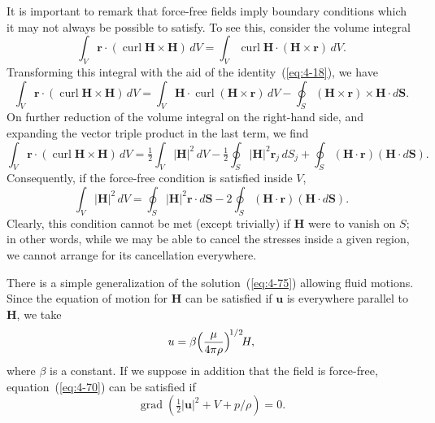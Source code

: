 It is important to remark that force-free fields imply boundary conditions which it may not always be possible to satisfy. To see this, consider the volume integral
\begin{equation}
\label{eq:4-76}
\int_V \mathbf{r}\cdot(\operatorname{curl}\mathbf{H}\times\mathbf{H})\,dV = \int_V \operatorname{curl}\mathbf{H}\cdot(\mathbf{H}\times\mathbf{r})\,dV.
\end{equation}
Transforming this integral with the aid of the identity~(\ref{eq:4-18}), we have
\begin{equation}
\label{eq:4-77}
\int_V \mathbf{r}\cdot(\operatorname{curl}\mathbf{H}\times\mathbf{H})\,dV = \int_V \mathbf{H}\cdot\operatorname{curl}(\mathbf{H}\times\mathbf{r})\,dV - \oint_S (\mathbf{H}\times\mathbf{r})\times\mathbf{H}\cdot d\mathbf{S}.
\end{equation}
On further reduction of the volume integral on the right-hand side, and expanding the vector triple product in the last term, we find
\begin{equation}
\label{eq:4-78}
\int_V \mathbf{r}\cdot(\operatorname{curl}\mathbf{H}\times\mathbf{H})\,dV = \tfrac{1}{2}\int_V |\mathbf{H}|^2\,dV - \tfrac{1}{2}\oint_S |\mathbf{H}|^2 \mathbf{r}_j\,dS_j + \oint_S (\mathbf{H}\cdot\mathbf{r})(\mathbf{H}\cdot d\mathbf{S}).
\end{equation}
Consequently, if the force-free condition is satisfied inside $V$,
\begin{equation}
\label{eq:4-79}
\int_V |\mathbf{H}|^2\,dV = \oint_S |\mathbf{H}|^2\mathbf{r}\cdot d\mathbf{S} - 2\oint_S (\mathbf{H}\cdot\mathbf{r})(\mathbf{H}\cdot d\mathbf{S}).
\end{equation}
Clearly, this condition cannot be met (except trivially) if $\mathbf{H}$ were to vanish on $S$; in other words, while we may be able to cancel the stresses inside a given region, we cannot arrange for its cancellation everywhere.

There is a simple generalization of the solution~(\ref{eq:4-75}) allowing fluid motions. Since the equation of motion for $\mathbf{H}$ can be satisfied if $\mathbf{u}$ is everywhere parallel to $\mathbf{H}$, we take
\begin{equation}
\label{eq:4-80}
\mathbf{u} = \beta\Bigl(\frac{\mu}{4\pi\rho}\Bigr)^{\!1/2}\!\mathbf{H},
\end{equation}
where $\beta$ is a constant. If we suppose in addition that the field is force-free, equation~(\ref{eq:4-70}) can be satisfied if
\begin{equation}
\label{eq:4-81}
\operatorname{grad}(\tfrac{1}{2}|\mathbf{u}|^2+V+p/\rho) = 0.
\end{equation}

